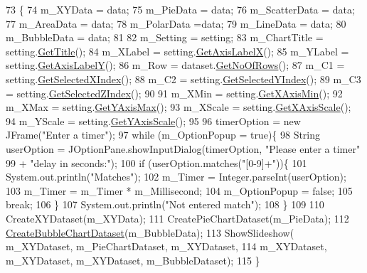 \begin{DoxyCode}
73                                     \{
74         m\_XYData = data;
75         m\_PieData = data;
76         m\_ScatterData = data; 
77         m\_AreaData = data; 
78         m\_PolarData =data;
79         m\_LineData = data;
80         m\_BubbleData = data;
81         
82         m\_Setting = setting;
83         m\_ChartTitle = setting.\hyperlink{class_data_attribute_ade9747a192ba22fe1020e874bff6a48c}{GetTitle}();
84         m\_XLabel = setting.\hyperlink{class_data_attribute_aecb451704a87d77dd80dbad8a19099d1}{GetAxisLabelX}();
85         m\_YLabel = setting.\hyperlink{class_data_attribute_af5f68794cd0195d42135d5e48120ccc0}{GetAxisLabelY}();
86         m\_Row = dataset.\hyperlink{class_dataset_a91257a605317576e87e1c32e54739e51}{GetNoOfRows}();
87         m\_C1 = setting.\hyperlink{class_data_attribute_a0f4a54973bc44b0526f78bda945dc81b}{GetSelectedXIndex}();
88         m\_C2 = setting.\hyperlink{class_data_attribute_a82e7519853d9f470ea183dd0c39a03d6}{GetSelectedYIndex}();
89         m\_C3 = setting.\hyperlink{class_data_attribute_a802ca8ea739cff583380ea27647250c7}{GetSelectedZIndex}();
90         
91         m\_XMin = setting.\hyperlink{class_data_attribute_afa9da883abc4abad5f64c045de114c50}{GetXAxisMin}();
92         m\_XMax = setting.\hyperlink{class_data_attribute_a81243eb8f7008e05e74b0f3571d2f08d}{GetYAxisMax}();
93         m\_XScale = setting.\hyperlink{class_data_attribute_a5a1de25600487aa958a19ce01151fea4}{GetXAxisScale}();
94         m\_YScale = setting.\hyperlink{class_data_attribute_a95259727ce91efc0e0eaa28487d944c5}{GetYAxisScale}();
95         
96         timerOption = \textcolor{keyword}{new} JFrame(\textcolor{stringliteral}{"Enter a timer"});
97         \textcolor{keywordflow}{while} (m\_OptionPopup = \textcolor{keyword}{true})\{
98             String userOption = JOptionPane.showInputDialog(timerOption, \textcolor{stringliteral}{"Please enter a timer"}
99                     + \textcolor{stringliteral}{"delay in seconds:"});
100               \textcolor{keywordflow}{if} (userOption.matches(\textcolor{stringliteral}{"[0-9]+"}))\{
101                   System.out.println(\textcolor{stringliteral}{"Matches"});
102                   m\_Timer = Integer.parseInt(userOption);
103                   m\_Timer = m\_Timer * m\_Millisecond;
104                   m\_OptionPopup = \textcolor{keyword}{false};
105                   \textcolor{keywordflow}{break};
106               \}
107               System.out.println(\textcolor{stringliteral}{"Not entered match"});
108         \} 
109         
110         CreateXYDataset(m\_XYData);
111         CreatePieChartDataset(m\_PieData);
112         \hyperlink{class_slideshow_a8eabfefadfab208b396dcfef42f052a1}{CreateBubbleChartDataset}(m\_BubbleData);
113         ShowSlideshow( m\_XYDataset, m\_PieChartDataset, m\_XYDataset,
114                 m\_XYDataset, m\_XYDataset, m\_XYDataset, m\_BubbleDataset);
115    \}
\end{DoxyCode}
